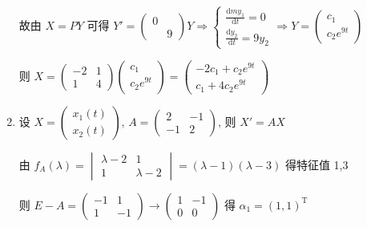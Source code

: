 \begin{enumerate}
			       故由 \( X = P Y \) 可得 \( Y' = \begin{pmatrix}
				       0 &   \\
				         & 9
			       \end{pmatrix} Y \Rightarrow \begin{cases}
				       \frac{\mathrm{d}my_{1}}{\mathrm{d}t} = 0 \\
				       \frac{\mathrm{d}y_{2}}{\mathrm{d}t} = 9y_{2}
			       \end{cases} \Rightarrow Y = \begin{pmatrix}
				       c_{1} \\
				       c_{2}e^{9t}
			       \end{pmatrix} \)

			       则 \( X = \begin{pmatrix}
				       -2 & 1 \\
				       1  & 4
			       \end{pmatrix}\begin{pmatrix}
				       c_{1} \\
				       c_{2}e^{9t}
			       \end{pmatrix} = \begin{pmatrix}
				       -2c_{1} + c_{2}e^{9t} \\
				       c_{1} + 4c_{2}e^{9t}
			       \end{pmatrix} \)
			 \item %
			       设 \( X = \begin{pmatrix}
				       x_{1}(t) \\
				       x_{2}(t)
			       \end{pmatrix} \), \( A = \begin{pmatrix}
				       2  & -1 \\
				       -1 & 2
			       \end{pmatrix} \), 则 \( X' = AX \)

			       由 \( f_{A}(\lambda) = \begin{vmatrix}
				       \lambda-2 & 1         \\
				       1         & \lambda-2
			       \end{vmatrix} = (\lambda-1)(\lambda-3) \) 得特征值 1,3

			       则 \( E-A = \begin{pmatrix}
				       -1 & 1  \\
				       1  & -1
			       \end{pmatrix} \rightarrow \begin{pmatrix}
				       1 & -1 \\
				       0 & 0
			       \end{pmatrix} \) 得 \( \alpha_{1} = (1, 1)^{\mathrm{T}} \)


\end{enumerate}
